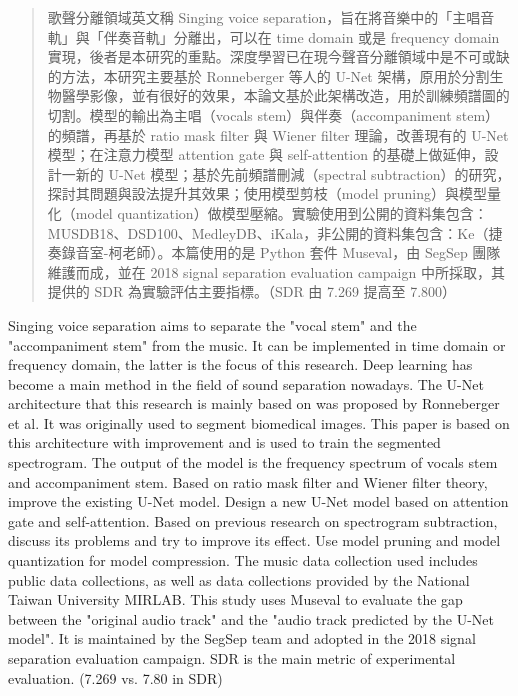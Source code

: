 
\begin{abstract}

歌聲分離領域英文稱 Singing voice separation，旨在將音樂中的「主唱音軌」與「伴奏音軌」分離出，可以在 time domain 或是 frequency domain 實現，後者是本研究的重點。深度學習已在現今聲音分離領域中是不可或缺的方法，本研究主要基於 Ronneberger 等人的 U-Net 架構，原用於分割生物醫學影像，並有很好的效果，本論文基於此架構改造，用於訓練頻譜圖的切割。模型的輸出為主唱（vocals stem）與伴奏（accompaniment stem）的頻譜，再基於 ratio mask filter 與 Wiener filter 理論，改善現有的 U-Net 模型；在注意力模型 attention gate 與 self-attention 的基礎上做延伸，設計一新的 U-Net 模型；基於先前頻譜刪減（spectral subtraction）的研究，探討其問題與設法提升其效果；使用模型剪枝（model pruning）與模型量化（model quantization）做模型壓縮。實驗使用到公開的資料集包含：MUSDB18、DSD100、MedleyDB、iKala，非公開的資料集包含：Ke（捷奏錄音室-柯老師）。本篇使用的是 Python 套件 Museval，由 SegSep 團隊維護而成，並在 2018 signal separation evaluation campaign 中所採取，其提供的 SDR 為實驗評估主要指標。（SDR 由 7.269 提高至 7.800）

\end{abstract}

\begin{abstract*}

Singing voice separation aims to separate the "vocal stem" and the "accompaniment stem" from the music. It can be implemented in time domain or frequency domain, the latter is the focus of this research. Deep learning has become a main method in the field of sound separation nowadays. The U-Net architecture that this research is mainly based on was proposed by Ronneberger et al. It was originally used to segment biomedical images. This paper is based on this architecture with improvement and is used to train the segmented spectrogram. The output of the model is the frequency spectrum of vocals stem and accompaniment stem.
Based on ratio mask filter and Wiener filter theory, improve the existing U-Net model. Design a new U-Net model based on attention gate and self-attention. Based on previous research on spectrogram subtraction, discuss its problems and try to improve its effect. Use model pruning and model quantization for model compression. The music data collection used includes public data collections, as well as data collections provided by the National Taiwan University MIRLAB. This study uses Museval to evaluate the gap between the "original audio track" and the "audio track predicted by the U-Net model". It is maintained by the SegSep team and adopted in the 2018 signal separation evaluation campaign. SDR is the main metric of experimental evaluation. (7.269 vs. 7.80 in SDR)

\end{abstract*}